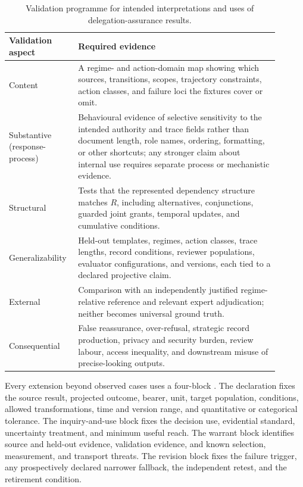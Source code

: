 \begin{table}[tbp]
\small
\centering
\setlength{\tabcolsep}{3pt}
\begin{tabular}{>{\raggedright\arraybackslash}p{0.20\linewidth}%
                >{\raggedright\arraybackslash}p{0.70\linewidth}}
\toprule
Validation aspect & Required evidence \\
\midrule
Content & A regime- and action-domain map showing which sources, transitions, scopes, trajectory constraints, action classes, and failure loci the fixtures cover or omit. \\
Substantive (response-process) & Behavioural evidence of selective sensitivity to the intended authority and trace fields rather than document length, role names, ordering, formatting, or other shortcuts; any stronger claim about internal use requires separate process or mechanistic evidence. \\
Structural & Tests that the represented dependency structure matches \(R\), including alternatives, conjunctions, guarded joint grants, temporal updates, and cumulative conditions. \\
Generalizability & Held-out templates, regimes, action classes, trace lengths, record conditions, reviewer populations, evaluator configurations, and versions, each tied to a declared projective claim. \\
External & Comparison with an independently justified regime-relative reference and relevant expert adjudication; neither becomes universal ground truth. \\
Consequential & False reassurance, over-refusal, strategic record production, privacy and security burden, review labour, access inequality, and downstream misuse of precise-looking outputs. \\
\bottomrule
\end{tabular}
\caption{Validation programme for intended interpretations and uses of delegation-assurance results.}
\label{tab:delegation-validation}
\end{table}

Every extension beyond observed cases uses a four-block . The declaration fixes the source result, projected outcome, bearer, unit, target population, conditions, allowed transformations, time and version range, and quantitative or categorical tolerance. The inquiry-and-use block fixes the decision use, evidential standard, uncertainty treatment, and minimum useful reach. The warrant block identifies source and held-out evidence, validation evidence, and known selection, measurement, and transport threats. The revision block fixes the failure trigger, any prospectively declared narrower fallback, the independent retest, and the retirement condition.

